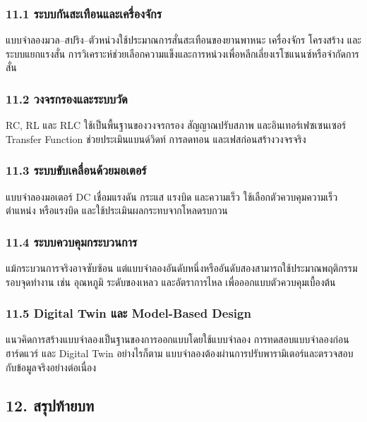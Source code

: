 \subsubsection{11.1 ระบบกันสะเทือนและเครื่องจักร}

แบบจำลองมวล–สปริง–ตัวหน่วงใช้ประมาณการสั่นสะเทือนของยานพาหนะ เครื่องจักร โครงสร้าง และระบบแยกแรงสั่น การวิเคราะห์ช่วยเลือกความแข็งและการหน่วงเพื่อหลีกเลี่ยงเรโซแนนซ์หรือจำกัดการสั่น

\subsubsection{11.2 วงจรกรองและระบบวัด}

RC, RL และ RLC ใช้เป็นพื้นฐานของวงจรกรอง สัญญาณปรับสภาพ และอินเทอร์เฟซเซนเซอร์ Transfer Function ช่วยประเมินแบนด์วิดท์ การลดทอน และเฟสก่อนสร้างวงจรจริง

\subsubsection{11.3 ระบบขับเคลื่อนด้วยมอเตอร์}

แบบจำลองมอเตอร์ DC เชื่อมแรงดัน กระแส แรงบิด และความเร็ว ใช้เลือกตัวควบคุมความเร็ว ตำแหน่ง หรือแรงบิด และใช้ประเมินผลกระทบจากโหลดรบกวน

\subsubsection{11.4 ระบบควบคุมกระบวนการ}

แม้กระบวนการจริงอาจซับซ้อน แต่แบบจำลองอันดับหนึ่งหรืออันดับสองสามารถใช้ประมาณพฤติกรรมรอบจุดทำงาน เช่น อุณหภูมิ ระดับของเหลว และอัตราการไหล เพื่อออกแบบตัวควบคุมเบื้องต้น

\subsubsection{11.5 Digital Twin และ Model-Based Design}

แนวคิดการสร้างแบบจำลองเป็นฐานของการออกแบบโดยใช้แบบจำลอง การทดสอบแบบจำลองก่อนฮาร์ดแวร์ และ Digital Twin อย่างไรก็ตาม แบบจำลองต้องผ่านการปรับพารามิเตอร์และตรวจสอบกับข้อมูลจริงอย่างต่อเนื่อง


\subsection{12. สรุปท้ายบท}

